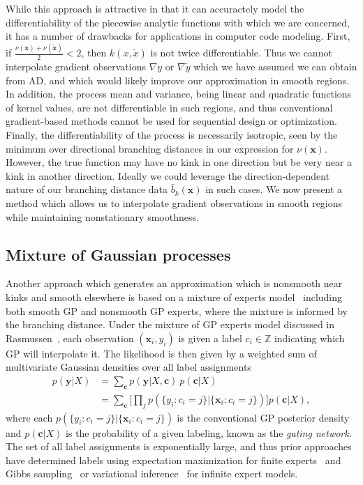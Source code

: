 \documentclass{article}
\renewcommand{\vec}[1]{\mathbf{#1}}
\newcommand{\Z}{\mathbb{Z}}
\numberwithin{equation}{section}
\begin{document}
While this approach is attractive in that it can accuractely model the differentiability of the piecewise analytic functions with which we are concerned, it has a number of drawbacks for applications in computer code modeling. First, if $\frac{\nu(\vec{x}) + \nu(\tilde{\vec{x}})}{2} < 2$, then $k(x, \tilde{x})$ is not twice differentiable. Thus we cannot interpolate gradient observations $\nabla y$ or $\nabla \tilde{y}$ which we have assumed we can obtain from AD, and which would likely improve our approximation in smooth regions. In addition, the process mean and variance, being linear and quadratic functions of kernel values, are not differentiable in such regions, and thus conventional gradient-based methods cannot be used for sequential design or optimization. Finally, the differentiability of the process is necessarily isotropic, seen by the minimum over directional branching distances in our expression for $\nu(\vec{x})$. However, the true function may have no kink in one direction but be very near a kink in another direction. Ideally we could leverage the direction-dependent nature of our branching distance data $\hat{b}_k(\vec{x})$ in such cases. We now present a method which allows us to interpolate gradient observations in smooth regions while maintaining nonstationary smoothness.

\subsection{Mixture of Gaussian processes}
Another approach which generates an approximation which is nonsmooth near kinks and smooth elsewhere is based on a mixture of experts model~\cite{jacobs1991adaptive} including both smooth GP and nonsmooth GP experts, where the mixture is informed by the branching distance. Under the mixture of GP experts model discussed in Rasmussen~\cite{rasmussen2002infinite}, each observation $(\vec{x}_i, y_i)$ is given a label $c_i \in \Z$ indicating which GP will interpolate it. The likelihood is then given by a weighted sum of multivariate Gaussian densities over all label assignments
\begin{align*}
  p(\vec{y} | X) & = \sum_\vec{c} p(\vec{y} | X, \vec{c}) \ p(\vec{c} | X) \\
  & = \sum_\vec{c} \bigg[ \prod_{j} p(\{y_i : c_i = j \} | \{\vec{x}_i : c_i = j \}) \bigg] p(\vec{c} | X),
\end{align*}
where each $p(\{y_i : c_i = j \} | \{\vec{x}_i : c_i = j \})$ is the conventional GP posterior density and $p(\vec{c} | X)$ is the probability of a given labeling, known as the \textit{gating network}. The set of all label assignments is exponentially large, and thus prior approaches have determined labels using expectation maximization for finite experts~\cite{tresp2001mixtures} and Gibbs sampling~\cite{meeds2006alternative} or variational inference~\cite{yuan2009variational} for infinite expert models.
\end{document}
